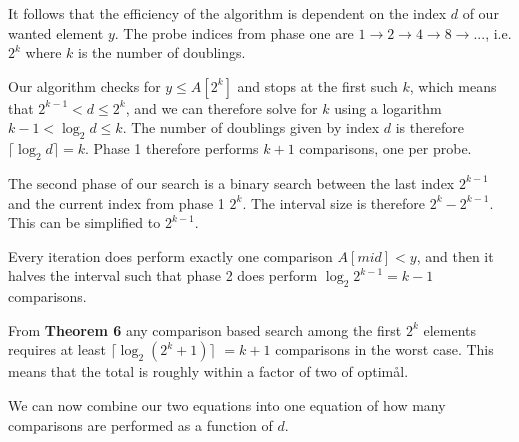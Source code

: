 \documentclass{article}
\begin{document}
%
%
\begin{center}
	\begin{minipage}{8.8cm}
		\begin{algorithmic}

			\EndWhile
			 

			\vspace{5mm}

			\Else
			\EndIf
			\EndWhile


			\EndProcedure
		\end{algorithmic}
	\end{minipage}
\end{center}

It follows that the efficiency of the algorithm is dependent on the index $d$ of our wanted element $y$.
The probe indices from phase one are $1 \rightarrow 2 \rightarrow 4 \rightarrow 8 \rightarrow ...$, i.e. $2^k$ where $k$ is the number of doublings.

Our algorithm checks for $y \leq A[2^k]$ and stops at the first such $k$, which means that $2^{k-1}<d \leq 2^k$, and we can therefore solve for $k$ using a logarithm $k-1 < \log_2{d}\leq k$.
The number of doublings given by index $d$ is therefore $\lceil \log_2{d}\rceil=k$. Phase 1 therefore performs $k+1$ comparisons, one per probe.

The second phase of our search is a binary search between the last index $2^{k-1}$ and the current index from phase 1 $2^{k}$.
The interval size is therefore $2^{k} - 2^{k-1}$.
This can be simplified to $2^{k-1}$.

Every iteration does perform exactly one comparison $A[mid] < y$, and then it halves the interval such that phase 2 does perform $\log_2{2^{k-1}} = k-1$ comparisons.

From \textcite{SupplementaryADS} \textbf{Theorem 6} any comparison based search among the first $2^k$ elements requires at least $\lceil\log_2{(2^k+1)}\rceil$ $=k+1$ comparisons in the worst case. This means that the total is roughly within a factor of two of optimål.

We can now combine our two equations into one equation of how many comparisons are performed as a function of $d$.
\end{document}
